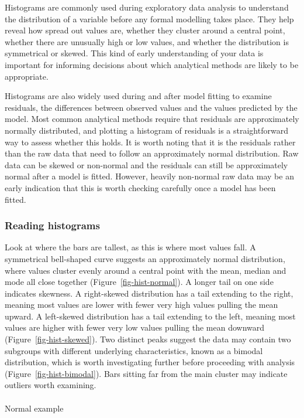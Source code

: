 \documentclass[
  letterpaper,
  DIV=11,
  numbers=noendperiod]{scrartcl}
\makeatletter
\let\oldparagraph\paragraph
\renewcommand{\paragraph}{
    \@ifstar
      \xxxParagraphStar
      \xxxParagraphNoStar
  }
\newcommand{\xxxParagraphStar}[1]{\oldparagraph*{#1}\mbox{}}
\newcommand{\xxxParagraphNoStar}[1]{\oldparagraph{#1}\mbox{}}
\makeatother
\begin{document}
Histograms are commonly used during exploratory data analysis to
understand the distribution of a variable before any formal modelling
takes place. They help reveal how spread out values are, whether they
cluster around a central point, whether there are unusually high or low
values, and whether the distribution is symmetrical or skewed. This kind
of early understanding of your data is important for informing decisions
about which analytical methods are likely to be appropriate.

Histograms are also widely used during and after model fitting to
examine residuals, the differences between observed values and the
values predicted by the model. Most common analytical methods require
that residuals are approximately normally distributed, and plotting a
histogram of residuals is a straightforward way to assess whether this
holds. It is worth noting that it is the residuals rather than the raw
data that need to follow an approximately normal distribution. Raw data
can be skewed or non-normal and the residuals can still be approximately
normal after a model is fitted. However, heavily non-normal raw data may
be an early indication that this is worth checking carefully once a
model has been fitted.

\subsubsection{Reading histograms}\label{reading-histograms}

Look at where the bars are tallest, as this is where most values fall. A
symmetrical bell-shaped curve suggests an approximately normal
distribution, where values cluster evenly around a central point with
the mean, median and mode all close together
(Figure~\ref{fig-hist-normal}). A longer tail on one side indicates
skewness. A right-skewed distribution has a tail extending to the right,
meaning most values are lower with fewer very high values pulling the
mean upward. A left-skewed distribution has a tail extending to the
left, meaning most values are higher with fewer very low values pulling
the mean downward (Figure~\ref{fig-hist-skewed}). Two distinct peaks
suggest the data may contain two subgroups with different underlying
characteristics, known as a bimodal distribution, which is worth
investigating further before proceeding with analysis
(Figure~\ref{fig-hist-bimodal}). Bars sitting far from the main cluster
may indicate outliers worth examining.

\paragraph{Normal example}
\end{document}
